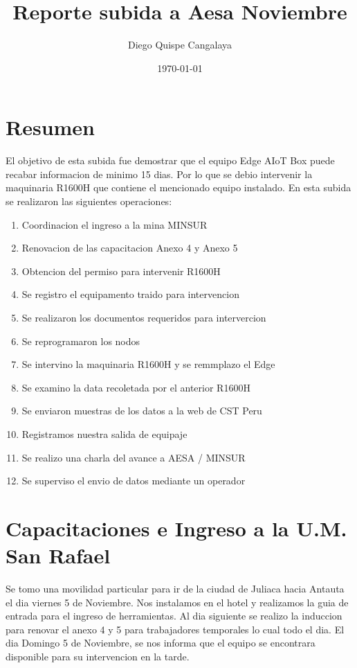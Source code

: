 \documentclass{article}
\begin{document}
\title{Reporte subida a Aesa Noviembre}
\author{Diego Quispe Cangalaya}
\date{\today}

\maketitle

\tableofcontents
\newpage 

\listoffigures
\newpage 


\section{Resumen}
El objetivo de esta subida fue demostrar que el equipo Edge AIoT Box puede recabar informacion de minimo 15 dias.
Por lo que se debio intervenir la maquinaria R1600H que contiene el mencionado equipo instalado.
\vspace{5mm}
\newline En esta subida se realizaron las siguientes operaciones:
\begin{enumerate}
    \item Coordinacion el ingreso a la mina MINSUR
    \item Renovacion de las capacitacion Anexo 4 y Anexo 5
    \item Obtencion del permiso para intervenir R1600H
    \item Se registro el equipamento traido para intervencion
    \item Se realizaron los documentos requeridos para intervercion
    \item Se reprogramaron los nodos
    \item Se intervino la maquinaria R1600H y se remmplazo el Edge
    \item Se examino la data recoletada por el anterior R1600H
    \item Se enviaron muestras de los datos a la web de CST Peru
    \item Registramos nuestra salida de equipaje
    \item Se realizo una charla del avance a AESA / MINSUR
    \item Se superviso el envio de datos mediante un operador
\end{enumerate}

\newpage 


\section{Capacitaciones e Ingreso a la U.M. San Rafael}
Se tomo una movilidad particular para ir de la ciudad de Juliaca hacia Antauta el dia viernes 5 de Noviembre. 
Nos instalamos en el hotel y realizamos la guia de entrada para el ingreso de herramientas.
\vspace{5mm}
\newline
Al dia siguiente se realizo la induccion para renovar el anexo 4 y 5 para trabajadores temporales lo cual todo el dia.
\vspace{5mm}
\newline
El dia Domingo 5 de Noviembre, se nos informa que el equipo se encontrara disponible para su intervencion en la tarde.
\newpage 
\end{document}

